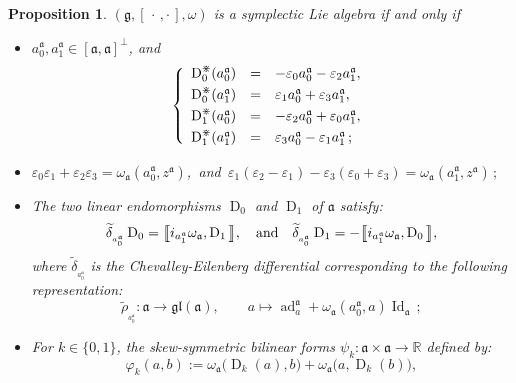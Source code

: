 \documentclass[final,1p,times,nopreprintline]{elsarticle}
\newtheorem{proposition}{Proposition}[section]
\theoremstyle{definition}
\numberwithin{equation}{section}
\newcommand{\rel}{\mathbb{R}}
\newcommand{\w}{\omega}
\newcommand{\et}{\quad \textnormal{and}\quad}
\newcommand{\id}{\operatorname{Id}}
\newcommand{\g}{\mathfrak{g}}
\newcommand{\ai}{\mathfrak{a}}
\newcommand{\ad}{\operatorname{ad}}
\numberwithin{equation}{section}
\newcommand{\D}{\operatorname{D}}
\newcommand{\gl}{\mathfrak{gl}}
\newcommand{\cro}{[\,\cdot\,,\cdot\,]}
\begin{document}
\begin{proposition}\label{PropSymLiAlgDoblExtDim2Prop0}
$(\g,\cro,\w)$ is a symplectic Lie algebra if and only if
\begin{itemize}
	\item[$1.$] $a^\ai_0,a^\ai_1\in[\ai,\ai]^\perp$, and
	\begin{equation}\label{PropSymLiAlgDoblExtDim2Prop0-C2}
\left\{
\begin{array}{r c l}\vspace{1mm}
\D^\divideontimes_0(a^\ai_0)&=&-\varepsilon_0a^\ai_0-\varepsilon_2a^\ai_1,\\	\vspace{1mm}
\D^\divideontimes_0(a^\ai_1)&=&\varepsilon_1a^\ai_0+\varepsilon_3a^\ai_1,\\\vspace{1mm}
\D^\divideontimes_1(a^\ai_0)&=&-\varepsilon_2a^\ai_0+\varepsilon_0a^\ai_1,\\
\D^\divideontimes_1(a^\ai_1)&=&\varepsilon_3a^\ai_0-\varepsilon_1a^\ai_1\,;
\end{array}	
		\right.\\\vspace{1mm}
	\end{equation}
	\item[$2.$] $\varepsilon_0\varepsilon_1+\varepsilon_2\varepsilon_3=\w_\ai(a^\ai_0,z^\ai)$,\, and\, $\varepsilon_1(\varepsilon_2-\varepsilon_1)-\varepsilon_3(\varepsilon_0+\varepsilon_3)=\w_\ai(a^\ai_1,z^\ai)\,;$\vspace{1mm}
	\item[$3.$] The two linear endomorphisms $\D_0$ and $\D_1$ of $\ai$ satisfy:
	\begin{equation*}
		\widetilde{\delta}_{_{a^\ai_0}}\D_0=\big\llbracket i_{a^\ai_1}\w_\ai,\D_1\big\rrbracket,\et \widetilde{\delta}_{_{a^\ai_0}}\D_1=-\big\llbracket i_{a^\ai_1}\w_\ai,\D_0\big\rrbracket,
	\end{equation*}
	where $\widetilde{\delta}_{_{a^\ai_0}}$ is the Chevalley-Eilenberg differential corresponding to the following representation:
	\begin{equation*}
		\widetilde{\rho}_{_{a^\ai_0}}:\ai\longrightarrow\gl(\ai),\qquad a\longmapsto\ad^\ai_a+\w_\ai(a^\ai_0,a)\id_\ai\,;
	\end{equation*}
	\item[$4.$] For $k\in\{0,1\}$, the skew-symmetric bilinear forms $\psi_k:\ai\times\ai\to\rel$ defined by:
	\begin{equation*}
		\varphi_k(a,b):=\w_\ai\big(\D_k(a),b\big)+\w_\ai\big(a,\D_k(b)\big),

\end{equation*}
\end{itemize}
\end{proposition}
\end{document}
